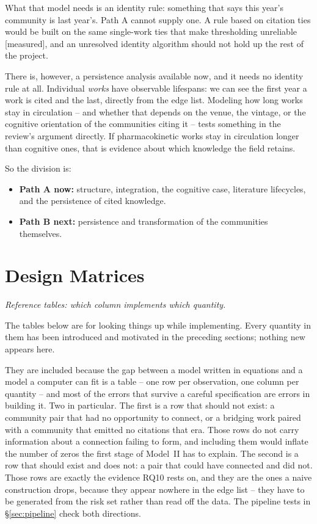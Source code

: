 \documentclass[11pt]{article}
\newcommand{\seccap}[1]{{\slshape\small #1\par}\vspace{0.8em}}
\newcommand{\meas}{{\footnotesize\textsf{[measured]}}}
\begin{document}
What that model needs is an identity rule: something that says this year's community is last
year's. Path A cannot supply one. A rule based on citation ties would be built on the same
single-work ties that make thresholding unreliable \meas{}, and an unresolved identity
algorithm should not hold up the rest of the project.

There is, however, a persistence analysis available now, and it needs no identity rule at
all. Individual \emph{works} have observable lifespans: we can see the first year a work is
cited and the last, directly from the edge list. Modeling how long works stay in circulation
-- and whether that depends on the venue, the vintage, or the cognitive orientation of the
communities citing it -- tests something in the review's argument directly. If
pharmacokinetic works stay in circulation longer than cognitive ones, that is evidence about
which knowledge the field retains.

So the division is:

\begin{itemize}[leftmargin=2em]
  \item \textbf{Path A now:} structure, integration, the cognitive case, literature
        lifecycles, and the persistence of cited knowledge.
  \item \textbf{Path B next:} persistence and transformation of the communities themselves.
\end{itemize}

\section{Design Matrices}
\label{sec:design}
\seccap{Reference tables: which column implements which quantity.}

The tables below are for looking things up while implementing. Every quantity in them has
been introduced and motivated in the preceding sections; nothing new appears here.

They are included because the gap between a model written in equations and a model a computer
can fit is a table -- one row per observation, one column per quantity -- and most of the
errors that survive a careful specification are errors in building it. Two in particular. The
first is a row that should not exist: a community pair that had no opportunity to connect, or
a bridging work paired with a community that emitted no citations that era. Those rows do not
carry information about a connection failing to form, and including them would inflate the
number of zeros the first stage of Model~II has to explain. The second is a row that should
exist and does not: a pair that could have connected and did not. Those rows are exactly the
evidence RQ10 rests on, and they are the ones a naive construction drops, because they appear
nowhere in the edge list -- they have to be generated from the risk set rather than read off
the data. The pipeline tests in \S\ref{sec:pipeline} check both directions.
\end{document}
